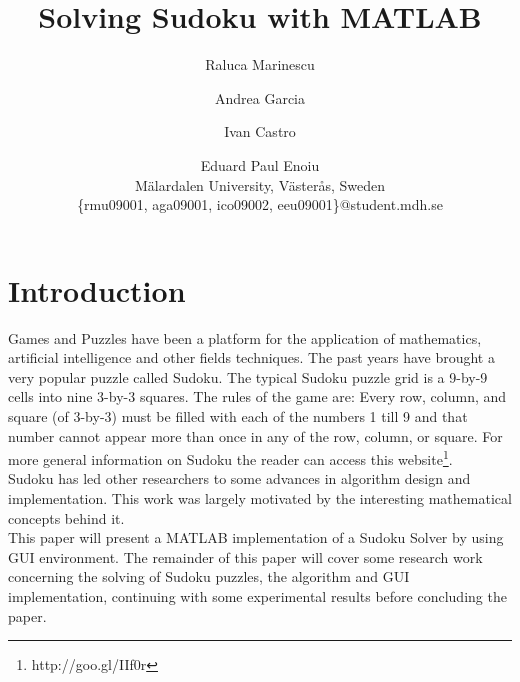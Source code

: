 \documentclass[12pt,a4paper]{article} %
\title{\bf{Solving Sudoku with MATLAB}} %
\author{Raluca Marinescu \and Andrea Garcia \and Ivan Castro \and Eduard Paul Enoiu \\
  Mälardalen University, Västerås, Sweden\\
  \textsf{\{rmu09001, aga09001,  ico09002, eeu09001\}@student.mdh.se}}
\begin{document}
\maketitle %
\begin{abstract}
\end{abstract}
\newpage
\tableofcontents
\newpage
\section{Introduction}
Games and Puzzles have been a platform for the application of mathematics, artificial intelligence and other fields techniques. The past years have brought a very popular puzzle called Sudoku. The typical Sudoku puzzle grid is a 9-by-9 cells into nine 3-by-3 squares. The rules of the game are: Every row, column, and square (of 3-by-3) must be filled with each of the numbers 1 till 9 and that number cannot appear more than once in any of the row, column, or square. For more general information on Sudoku the reader can access this website\footnote{http://goo.gl/IIf0r}.
\newline
\\Sudoku has led other researchers to some advances in algorithm design and implementation. This work was largely motivated by the interesting mathematical concepts behind it.
\newline
\\ This paper will present a MATLAB implementation of a Sudoku Solver by using GUI environment. The remainder of this paper will cover some research work concerning the solving of Sudoku puzzles, the algorithm and GUI implementation, continuing with some experimental results before concluding the paper.
\end{document}
